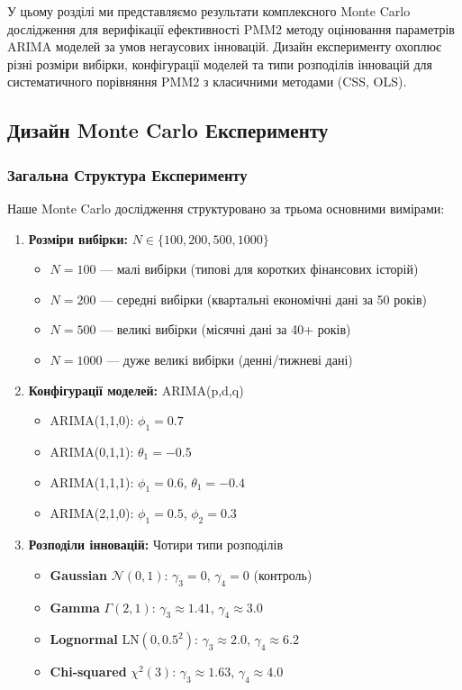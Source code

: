 \documentclass[12pt,a4paper]{article}
\begin{document}
	У цьому розділі ми представляємо результати комплексного Monte Carlo дослідження для верифікації ефективності PMM2 методу оцінювання параметрів ARIMA моделей за умов негаусових інновацій. Дизайн експерименту охоплює різні розміри вибірки, конфігурації моделей та типи розподілів інновацій для систематичного порівняння PMM2 з класичними методами (CSS, OLS).
	
	\subsection{Дизайн Monte Carlo Експерименту}
	\label{subsec:experiment_design}
	
	\subsubsection{Загальна Структура Експерименту}
	
	Наше Monte Carlo дослідження структуровано за трьома основними вимірами:
	
	\begin{enumerate}
		\item \textbf{Розміри вибірки:} $N \in \{100, 200, 500, 1000\}$
		\begin{itemize}
			\item $N = 100$ --- малі вибірки (типові для коротких фінансових історій)
			\item $N = 200$ --- середні вибірки (квартальні економічні дані за 50 років)
			\item $N = 500$ --- великі вибірки (місячні дані за 40+ років)
			\item $N = 1000$ --- дуже великі вибірки (денні/тижневі дані)
		\end{itemize}
		
		\item \textbf{Конфігурації моделей:} ARIMA(p,d,q)
		\begin{itemize}
			\item ARIMA(1,1,0): $\phi_1 = 0.7$
			\item ARIMA(0,1,1): $\theta_1 = -0.5$
			\item ARIMA(1,1,1): $\phi_1 = 0.6$, $\theta_1 = -0.4$
			\item ARIMA(2,1,0): $\phi_1 = 0.5$, $\phi_2 = 0.3$
		\end{itemize}
		
		\item \textbf{Розподіли інновацій:} Чотири типи розподілів
		\begin{itemize}
			\item \textbf{Gaussian} $\mathcal{N}(0,1)$: $\gamma_3 = 0$, $\gamma_4 = 0$ (контроль)
			\item \textbf{Gamma} $\Gamma(2,1)$: $\gamma_3 \approx 1.41$, $\gamma_4 \approx 3.0$
			\item \textbf{Lognormal} $\text{LN}(0, 0.5^2)$: $\gamma_3 \approx 2.0$, $\gamma_4 \approx 6.2$
			\item \textbf{Chi-squared} $\chi^2(3)$: $\gamma_3 \approx 1.63$, $\gamma_4 \approx 4.0$
		\end{itemize}
	\end{enumerate}
	
\end{document}
